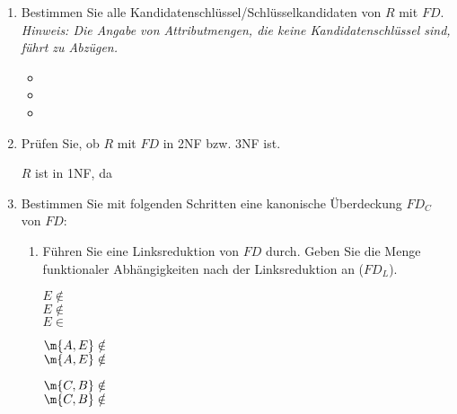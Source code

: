\documentclass{lehramt-informatik-aufgabe}
\begin{document}
\begin{enumerate}


\item Bestimmen Sie alle Kandidatenschlüssel/Schlüsselkandidaten von $R$
mit $FD$. \textit{Hinweis: Die Angabe von Attributmengen, die keine
Kandidatenschlüssel sind, führt zu Abzügen.}

\begin{liAntwort}
\begin{itemize}
\item {}
\item {}
\item {}
\end{itemize}
\end{liAntwort}


\item Prüfen Sie, ob $R$ mit $FD$ in 2NF bzw. 3NF ist.

\begin{liAntwort}
$R$ ist in 1NF, da 
\end{liAntwort}


\item Bestimmen Sie mit folgenden Schritten eine kanonische Überdeckung
$FD_C$ von $FD$:

\begin{enumerate}


\item Führen Sie eine Linksreduktion von $FD$ durch. Geben Sie die Menge
funktionaler Abhängigkeiten nach der Linksreduktion an ($FD_L$).

\begin{liAntwort}


$E \notin$ \\
$E \notin$  \\
$E \in$ 


$\m{A, E} \notin$ \\
$\m{A, E} \notin$ 


$\m{C, B} \notin$ \\
$\m{C, B} \notin$ 


\end{liAntwort}
\end{enumerate}
\end{enumerate}
\end{document}
